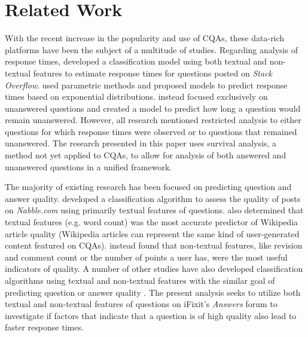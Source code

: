 \documentclass[preprint]{elsarticle}
\begin{document}
\section{Related Work}

With the recent increase in the popularity and use of CQAs, these data-rich platforms have been the subject of a multitude of studies. Regarding analysis of response times, \cite{Bhat2014} developed a classification model using both textual and non-textual features to estimate response times for questions posted on \textit{Stack Overflow}. \cite{Mahmud2013} used parametric methods and proposed models to predict response times based on exponential distributions. \cite{Asaduzzaman2013} instead focused exclusively on unanswered questions and created a model to predict how long a question would remain unanswered. However, all research mentioned restricted analysis to either questions for which response times were observed or to questions that remained unanswered. The research presented in this paper uses survival analysis, a method not yet applied to CQAs, to allow for analysis of both answered and unanswered questions in a unified framework. 

The majority of existing research has been focused on predicting question and answer quality. \cite{Weimer2007} developed a classification algorithm to assess the quality of posts on \textit{Nabble.com} using primarily textual features of questions. \cite{Blumenstock2008} also determined that textual features (e.g. word count) was the most accurate predictor of Wikipedia article quality (Wikipedia articles can represent the same kind of user-generated content featured on CQAs). \cite{Fu2015} instead found that non-textual features, like revision and comment count or the number of points a user has, were the most useful indicators of quality. A number of other studies have also developed classification algorithms using textual and non-textual features with the similar goal of predicting question or answer quality \cite{Yao2015, Toba2014, Ponzanelli2014a, Ravi2014}. The present analysis seeks to utilize both textual and non-textual features of questions on iFixit's \textit{Answers} forum to investigate if factors that indicate that a question is of high quality also lead to faster response times.

\end{document}
